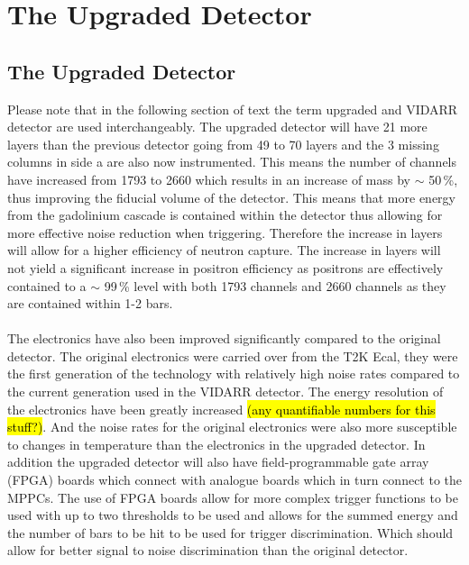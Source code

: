 \chapter{The Upgraded Detector} \label{Chp:TheUpgradedDetector}

\ifpdf
    \graphicspath{{Chapter3/Figs/Raster/}{Chapter3/Figs/PDF/}{Chapter3/Figs/}}
\else
    \graphicspath{{Chapter3/Figs/Vector/}{Chapter3/Figs/}}
\fi

\section{The Upgraded Detector}\label{sec_theUpgradedDetector}
Please note that in the following section of text the term upgraded and VIDARR detector are used interchangeably. The upgraded detector will have 21 more layers than the previous detector going from 49 to 70 layers and the 3 missing columns in side a are also now instrumented. This means the number of channels have increased from 1793 to 2660 which results in an increase of mass by $\sim$ 50\,\%, thus improving the fiducial volume of the detector. This means that more energy from the gadolinium cascade is contained within the detector thus allowing for more effective noise reduction when triggering. Therefore the increase in layers will allow for a higher efficiency of neutron capture. The increase in layers will not yield a significant increase in positron efficiency as positrons are effectively contained to a $\sim$ 99\,\% level with both 1793 channels and 2660 channels as they are contained within 1-2 bars.
\\\\The electronics have also been improved significantly compared to the original detector. The original electronics were carried over from the T2K Ecal, they were the first generation of the technology with relatively high noise rates compared to the current generation used in the VIDARR detector. The energy resolution of the electronics have been greatly increased \hl{(any quantifiable numbers for this stuff?)}. And the noise rates for the original electronics were also more susceptible to changes in temperature than the electronics in the upgraded detector. In addition the upgraded detector will also have field-programmable gate array (FPGA) boards which connect with analogue boards which in turn connect to the MPPCs. The use of FPGA boards allow for more complex trigger functions to be used with up to two thresholds to be used and allows for the summed energy and the number of bars to be hit to be used for trigger discrimination. Which should allow for better signal to noise discrimination than the original detector.
